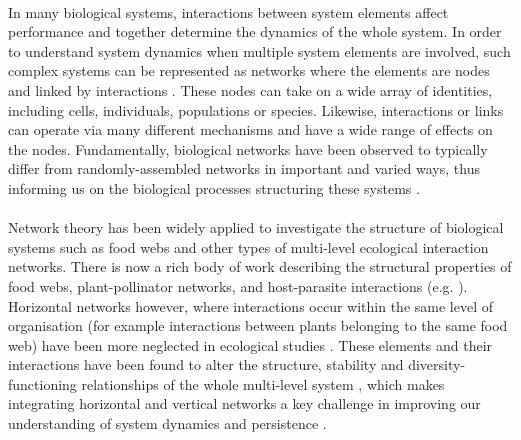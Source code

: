 \documentclass[a4,12pt]{article}
\begin{document}
    
    \paragraph{}
    In many biological systems, interactions between system elements affect performance and together determine the dynamics of the whole system. In order to understand system dynamics when multiple system elements are involved, such complex systems can be represented as networks where the elements are nodes and linked by interactions \parencite{Pimm1978}. These nodes can take on a wide array of identities, including cells, individuals, populations or species. Likewise, interactions or links can operate via many different mechanisms and have a wide range of effects on the nodes. Fundamentally, biological networks have been observed to typically differ from randomly-assembled networks in important and varied ways, thus informing us on the biological processes structuring these systems \parencite{Dunne2002}.

    \paragraph{}
    Network theory has been widely applied to investigate the structure of biological systems such as food webs and other types of multi-level ecological interaction networks. There is now a rich body of work describing the structural properties of food webs, plant-pollinator networks, and host-parasite interactions (e.g. \cite{Lafferty2008, Thompson2012, Dunne2013, Stouffer2014, Cirtwill2015a}). Horizontal networks however, where interactions occur within the same level of organisation (for example interactions between plants belonging to the same food web) have been more neglected in ecological studies \parencite{Ellison2019}. These elements and their interactions have been found to alter the structure, stability and diversity-functioning relationships of the whole multi-level system \parencite{Hammill2015, Giling2019, Zhao2019, Miele2019}, which makes integrating horizontal and vertical networks a key challenge in improving our understanding of system dynamics and persistence \parencite{Godoy2018c}.
\end{document}
